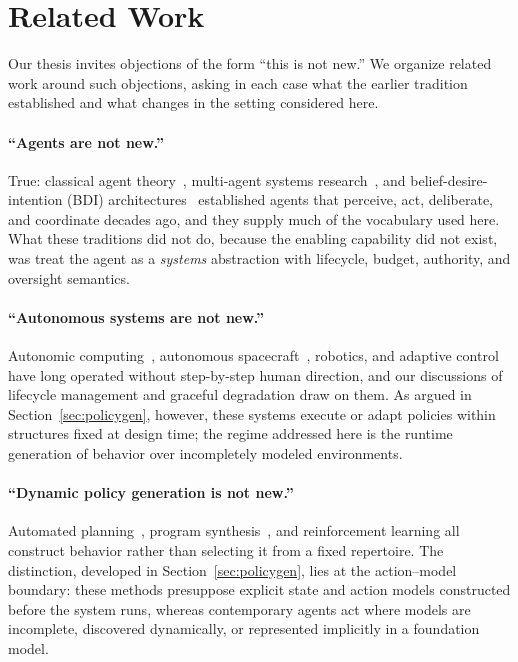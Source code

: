 \documentclass[11pt]{article}
\begin{document}
\section{Related Work}
\label{sec:related}

Our thesis invites objections of the form ``this is not new.'' We organize related work around such objections, asking in each case what the earlier tradition established and what changes in the setting considered here.

\paragraph{``Agents are not new.''} True: classical agent theory~\cite{russell_norvig}, multi-agent systems research~\cite{wooldridge_agents}, and belief-desire-intention (BDI) architectures~\cite{rao_georgeff} established agents that perceive, act, deliberate, and coordinate decades ago, and they supply much of the vocabulary used here. What these traditions did not do, because the enabling capability did not exist, was treat the agent as a \textit{systems} abstraction with lifecycle, budget, authority, and oversight semantics.

\paragraph{``Autonomous systems are not new.''} Autonomic computing~\cite{kephart_autonomic}, autonomous spacecraft~\cite{muscettola_remote_agent}, robotics, and adaptive control have long operated without step-by-step human direction, and our discussions of lifecycle management and graceful degradation draw on them. As argued in Section~\ref{sec:policygen}, however, these systems execute or adapt policies within structures fixed at design time; the regime addressed here is the runtime generation of behavior over incompletely modeled environments.

\paragraph{``Dynamic policy generation is not new.''} Automated planning~\cite{ghallab_planning}, program synthesis~\cite{gulwani_synthesis}, and reinforcement learning all construct behavior rather than selecting it from a fixed repertoire. The distinction, developed in Section~\ref{sec:policygen}, lies at the action--model boundary: these methods presuppose explicit state and action models constructed before the system runs, whereas contemporary agents act where models are incomplete, discovered dynamically, or represented implicitly in a foundation model.
\end{document}

